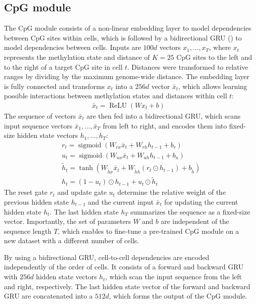\subsection{CpG module}

The CpG module consists of a non-linear embedding layer to model dependencies between CpG sites within cells, which is followed by a bidirectional GRU () to model dependencies between cells. Inputs are $100d$ vectors $x_1,\ldots,x_T$, where $x_t$ represents the methylation state and distance of $K=25$ CpG sites to the left and to the right of a target CpG site in cell $t$. Distances were transformed to relative ranges by dividing by the maximum genome-wide distance. The embedding layer is fully connected and transforms $x_t$ into a $256d$ vector $\bar{x}_t$, which allows learning possible interactions between methylation states and distances within cell $t$:
\begin{align}
  \bar{x}_t=\operatorname{ReLU} (W x_t + b)
\end{align}
The sequence of vectors $\bar{x}_t$ are then fed into a bidirectional GRU, which scans input sequence vectors $\bar{x}_1,\ldots,\bar{x}_T$ from left to right, and encodes them into fixed-size hidden state vectors $h_1,\ldots,h_T$:
\begin{align}
  &r_t=\operatorname{sigmoid}(W_{rx} \bar{x}_t + W_{rh} h_{t-1} + b_{r}) \nonumber \\
  &u_t=\operatorname{sigmoid}(W_{ux} \bar{x}_t + W_{uh} h_{t-1} + b_{u}) \nonumber \\
  &\tilde{h}_t=\operatorname{tanh}\left(W_{\tilde{h}x} \bar{x}_t + W_{\tilde{h}h}(r_t \odot h_{t-1}) + b_{\tilde{h}}\right) \nonumber \\
  &h_t = (1 - u_t) \odot h_{t-1} + u_t \odot \tilde{h}_t
\end{align}
The reset gate $r_t$ and update gate $u_t$ determine the relative weight of the previous hidden state $h_{t-1}$ and the current input $\bar{x}_t$ for updating the current hidden state $h_t$. The last hidden state $h_T$ summarizes the sequence as a fixed-size vector. Importantly, the set of parameters $W$ and $b$ are independent of the sequence length $T$, which enables to fine-tune a pre-trained CpG module on a new dataset with a different number of cells.

By using a bidirectional GRU, cell-to-cell dependencies are encoded independently of the order of cells. It consists of a forward and backward GRU with $256d$ hidden state vectors $h_t$, which scan the input sequence from the left and right, respectively. The last hidden state vector of the forward and backward GRU are concatenated into a $512d$, which forms the output of the CpG module.


